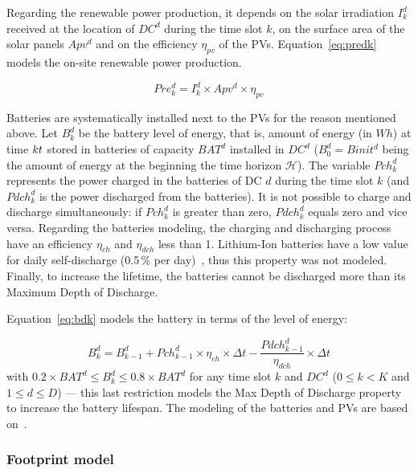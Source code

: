 Regarding the renewable power production, it depends on the solar irradiation $I^d_k$ received at the location of $DC^d$ during the time slot $k$, on the surface area of the solar panels $Apv^d$ and on the efficiency $\eta_{pv}$ of the PVs. Equation~\eqref{eq:predk} models the on-site renewable power production.

\begin{equation} \label{eq:predk}
    Pre^d_{k}= I^d_k \times Apv^d \times \eta_{pv}
\end{equation}

Batteries are systematically installed next to the PVs for the reason mentioned above. Let $B^d_k$ be the battery level of energy, that is, amount of energy (in $Wh$) at time $k\time\Delta t$ stored in batteries of capacity $BAT^d$ installed in $DC^d$ ($B^d_0 = Binit^d$ being the amount of energy at the beginning the time horizon $\mathcal{H}$). The variable $Pch_k^d$ represents the power charged in the batteries of DC $d$ during the time slot $k$ (and $Pdch_k^d$ is the power discharged from the batteries). It is not possible to charge and discharge simultaneously: if $Pch^d_k$ is greater than zero, $Pdch^d_k$ equals zero and vice versa. Regarding the batteries modeling, the charging and discharging process have an efficiency $\eta_{ch}$ and $\eta_{dch}$ less than 1. Lithium-Ion batteries have a low value for daily self-discharge (0.5\,\% per day)~\cite{wang2012_EDCS}, thus this property was not modeled. Finally, to increase the lifetime, the batteries cannot be discharged more than its Maximum Depth of Discharge. 

Equation~\eqref{eq:bdk} models the battery in terms of the level of energy:

\begin{equation} \label{eq:bdk}
  B^d_k = B^d_{k-1}  + Pch^d_{k-1} \times \eta_{ch} \times \Delta{t} - \frac{Pdch^d_{k-1}}{\eta_{dch}} \times \Delta{t}
\end{equation}
with $0.2\times BAT^d \leq B^d_k\leq 0.8\times BAT^d$ for any time slot $k$ and $DC^d$ ($0\leq k<K$ and $1\leq d\leq D$) --- this last restriction models the Max Depth of Discharge property to increase the battery lifespan. The modeling of the batteries and PVs are based on~\cite{2021NICOD_ILP}.


\subsubsection{Footprint model} \label{sec:footprintmodel_ccgrid}


